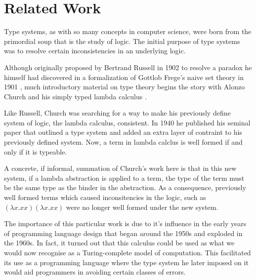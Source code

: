 \documentclass{ProgressReport}[2020/09/15]
\begin{document}
        \chapter{Related Work}

          Type systems, as with so many concepts in computer science,
          were born from the primordial soup that is the study of
          logic. The initial purpose of type systems was to resolve
          certain inconsistencies in an underlying logic. 
      
          Although originally proposed by Bertrand Russell in 1902 to
          resolve a paradox he himself had discovered in a formalization of
          Gottlob Frege's naive set theory in 1901 \cite{Russell1901}, much
          introductory material on type theory begins the story with
          Alonzo Church and his simply typed lambda calculus
          \cite{church1940}.
      
          Like Russell, Church was searching for a way to make his
          previously define system of logic, the lambda calculus,
          consistent. In 1940 he published his seminal paper that outlined a
          type system and added an extra layer of contraint to his
          previously defined system. Now, a term in lambda calclus is well
          formed if and only if it is typeable.
      
          A concrete, if informal, summation of Church's work here is that
          in this new system, if a lambda abstraction is applied to a term,
          the type of the term must be the same type as the binder in the
          abstraction. As a consequence, previously well formed terms which
          caused inconsitencies in the logic, such as
          $ (\lambda x.xx)(\lambda x.xx)  $
          were no longer well formed under the new system.
      
          The importance of this particular work is due to it's influence in
          the early years of programming language design that began around
          the 1950s and exploded in the 1960s. In fact, it turned out
          that this calculus could be used as what we would now
          recognise as a Turing-complete model of computation. This
          facilitated its use as a programming language where the type
          system he later imposed on it would aid programmers in
          avoiding certain classes of errors. 
      
\end{document}
